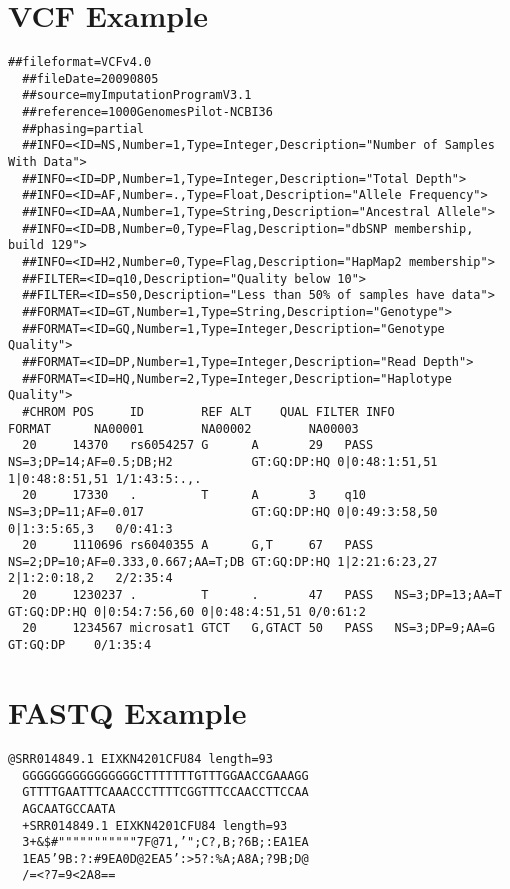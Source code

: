 \section{VCF Example}
\begin{lstlisting}[numbers=none, breaklines=true]
  ##fileformat=VCFv4.0
  ##fileDate=20090805
  ##source=myImputationProgramV3.1
  ##reference=1000GenomesPilot-NCBI36
  ##phasing=partial
  ##INFO=<ID=NS,Number=1,Type=Integer,Description="Number of Samples With Data">
  ##INFO=<ID=DP,Number=1,Type=Integer,Description="Total Depth">
  ##INFO=<ID=AF,Number=.,Type=Float,Description="Allele Frequency">
  ##INFO=<ID=AA,Number=1,Type=String,Description="Ancestral Allele">
  ##INFO=<ID=DB,Number=0,Type=Flag,Description="dbSNP membership, build 129">
  ##INFO=<ID=H2,Number=0,Type=Flag,Description="HapMap2 membership">
  ##FILTER=<ID=q10,Description="Quality below 10">
  ##FILTER=<ID=s50,Description="Less than 50% of samples have data">
  ##FORMAT=<ID=GT,Number=1,Type=String,Description="Genotype">
  ##FORMAT=<ID=GQ,Number=1,Type=Integer,Description="Genotype Quality">
  ##FORMAT=<ID=DP,Number=1,Type=Integer,Description="Read Depth">
  ##FORMAT=<ID=HQ,Number=2,Type=Integer,Description="Haplotype Quality">
  #CHROM POS     ID        REF ALT    QUAL FILTER INFO                              FORMAT      NA00001        NA00002        NA00003
  20     14370   rs6054257 G      A       29   PASS   NS=3;DP=14;AF=0.5;DB;H2           GT:GQ:DP:HQ 0|0:48:1:51,51 1|0:48:8:51,51 1/1:43:5:.,.
  20     17330   .         T      A       3    q10    NS=3;DP=11;AF=0.017               GT:GQ:DP:HQ 0|0:49:3:58,50 0|1:3:5:65,3   0/0:41:3
  20     1110696 rs6040355 A      G,T     67   PASS   NS=2;DP=10;AF=0.333,0.667;AA=T;DB GT:GQ:DP:HQ 1|2:21:6:23,27 2|1:2:0:18,2   2/2:35:4
  20     1230237 .         T      .       47   PASS   NS=3;DP=13;AA=T                   GT:GQ:DP:HQ 0|0:54:7:56,60 0|0:48:4:51,51 0/0:61:2
  20     1234567 microsat1 GTCT   G,GTACT 50   PASS   NS=3;DP=9;AA=G                    GT:GQ:DP    0/1:35:4 
\end{lstlisting}

\section{FASTQ Example}
\begin{lstlisting}[numbers=none, breaklines=true]
  @SRR014849.1 EIXKN4201CFU84 length=93
  GGGGGGGGGGGGGGGGCTTTTTTTGTTTGGAACCGAAAGG
  GTTTTGAATTTCAAACCCTTTTCGGTTTCCAACCTTCCAA
  AGCAATGCCAATA
  +SRR014849.1 EIXKN4201CFU84 length=93
  3+&$#"""""""""""7F@71,’";C?,B;?6B;:EA1EA
  1EA5’9B:?:#9EA0D@2EA5’:>5?:%A;A8A;?9B;D@
  /=<?7=9<2A8==
\end{lstlisting}

